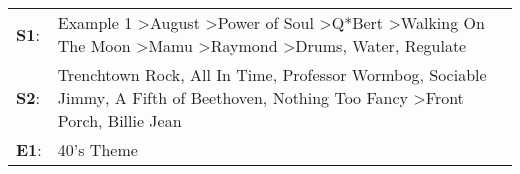 \begin{supertabular}{p{0.03\textwidth}p{0.92\textwidth}}
 \textbf{S1}:  &  Example 1\textsuperscript{} \textgreater \enspace August\textsuperscript{} \textgreater \enspace Power of Soul\textsuperscript{} \textgreater \enspace Q*Bert\textsuperscript{} \textgreater \enspace Walking On The Moon\textsuperscript{} \textgreater \enspace Mamu\textsuperscript{} \textgreater \enspace Raymond\textsuperscript{} \textgreater \enspace Drums\textsuperscript{}, \enspace Water\textsuperscript{}, \enspace Regulate\textsuperscript{}  \enspace  \\
 \textbf{S2}:  &                                                                                                  Trenchtown Rock\textsuperscript{}, \enspace All In Time\textsuperscript{}, \enspace Professor Wormbog\textsuperscript{}, \enspace Sociable Jimmy\textsuperscript{}, \enspace A Fifth of Beethoven\textsuperscript{}, \enspace Nothing Too Fancy\textsuperscript{} \textgreater \enspace Front Porch\textsuperscript{}, \enspace Billie Jean\textsuperscript{}  \enspace  \\
 \textbf{E1}:  &                                                                                                                                                                                                                                                                                                                                                                                                                                   40's Theme\textsuperscript{}  \enspace  \\
\end{supertabular}

